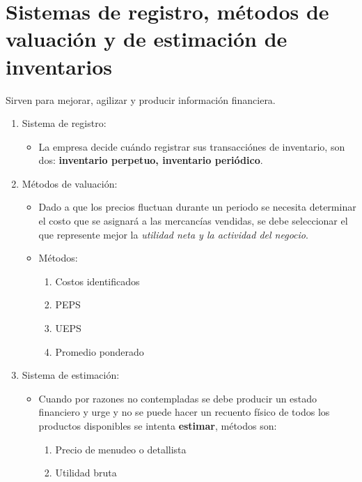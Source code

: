 \documentclass{article}
\begin{document}
\section{Sistemas de registro, métodos de valuación y de estimación de inventarios}
Sirven para mejorar, agilizar y producir información financiera.
\begin{enumerate}
    \item Sistema de registro:
    \begin{itemize}
        \item La empresa decide cuándo registrar sus transacciónes de inventario, son dos: \textbf{inventario perpetuo, inventario periódico}.
    \end{itemize}
    \item Métodos de valuación:
    \begin{itemize}
        \item Dado a que los precios fluctuan durante un periodo se necesita determinar el costo que se asignará a las mercancías vendidas, se debe seleccionar el que represente mejor la \emph{utilidad neta y la actividad del negocio}.
        \item Métodos:
        \begin{enumerate}
            \item Costos identificados
            \item PEPS 
            \item UEPS 
            \item Promedio ponderado
        \end{enumerate}
    \end{itemize}
    \item Sistema de estimación:
    \begin{itemize}
        \item Cuando por razones no contempladas se debe producir un estado financiero y urge y no se puede hacer un recuento físico de todos los productos disponibles se intenta \textbf{estimar}, métodos son:
        \begin{enumerate}
            \item Precio de menudeo o detallista
            \item Utilidad bruta
        \end{enumerate}
    \end{itemize}
\end{enumerate}
\end{document}
